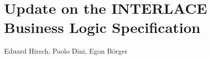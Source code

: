 \chapter{Update on the INTERLACE Business Logic Specification}
\label{ch:UpdateBLS}

\vspace{-1cm}
\begin{center}
Eduard Hirsch, Paolo Dini, Egon Börger
\end{center}

